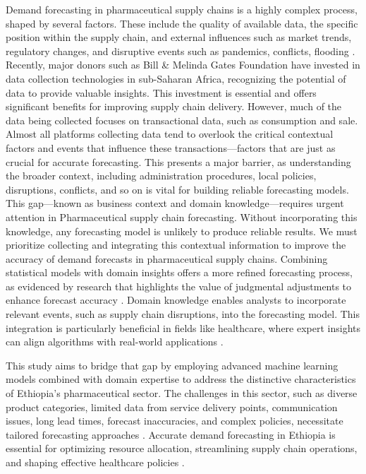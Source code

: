 \documentclass[
  authoryear,
  preprint,
  3p]{elsarticle}
\begin{document}
Demand forecasting in pharmaceutical supply chains is a highly complex
process, shaped by several factors. These include the quality of
available data, the specific position within the supply chain, and
external influences such as market trends, regulatory changes, and
disruptive events such as pandemics, conflicts, flooding
\citep{schneider2010pharmaceutical, hyndman2018forecasting}. Recently,
major donors such as Bill \& Melinda Gates Foundation have invested in
data collection technologies in sub-Saharan Africa, recognizing the
potential of data to provide valuable insights. This investment is
essential and offers significant benefits for improving supply chain
delivery. However, much of the data being collected focuses on
transactional data, such as consumption and sale. Almost all platforms
collecting data tend to overlook the critical contextual factors and
events that influence these transactions---factors that are just as
crucial for accurate forecasting. This presents a major barrier, as
understanding the broader context, including administration procedures,
local policies, disruptions, conflicts, and so on is vital for building
reliable forecasting models. This gap---known as business context and
domain knowledge---requires urgent attention in Pharmaceutical supply
chain forecasting. Without incorporating this knowledge, any forecasting
model is unlikely to produce reliable results. We must prioritize
collecting and integrating this contextual information to improve the
accuracy of demand forecasts in pharmaceutical supply chains. Combining
statistical models with domain insights offers a more refined
forecasting process, as evidenced by research that highlights the value
of judgmental adjustments to enhance forecast accuracy
\citep{fildes2007against, taylor2022artificial, soyiri2013overview}.
Domain knowledge enables analysts to incorporate relevant events, such
as supply chain disruptions, into the forecasting model. This
integration is particularly beneficial in fields like healthcare, where
expert insights can align algorithms with real-world applications
\citep{dash2022review}.

This study aims to bridge that gap by employing advanced machine
learning models combined with domain expertise to address the
distinctive characteristics of Ethiopia's pharmaceutical sector. The
challenges in this sector, such as diverse product categories, limited
data from service delivery points, communication issues, long lead
times, forecast inaccuracies, and complex policies, necessitate tailored
forecasting approaches
\citep{bilal2024challenges, boche2022procurement}. Accurate demand
forecasting in Ethiopia is essential for optimizing resource allocation,
streamlining supply chain operations, and shaping effective healthcare
policies \citep{rostami2022forecasting}.
\end{document}
